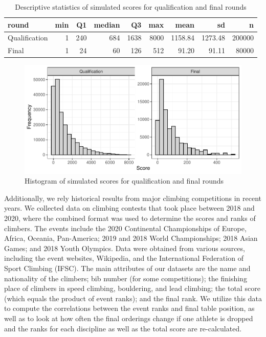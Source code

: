 \documentclass[12pt]{article}
\begin{document}
\begin{table}[H]

\caption{\label{tab:unnamed-chunk-4}Descriptive statistics of simulated scores for qualification and final rounds}
\centering
\begin{tabular}[t]{lrrrrrrrr}
\toprule
round & min & Q1 & median & Q3 & max & mean & sd & n\\
\midrule
Qualification & 1 & 240 & 684 & 1638 & 8000 & 1158.84 & 1273.48 & 200000\\
Final & 1 & 24 & 60 & 126 & 512 & 91.20 & 91.11 & 80000\\
\bottomrule
\end{tabular}
\end{table}

\begin{figure}

{\centering \includegraphics{draft_files/figure-latex/unnamed-chunk-5-1} 

}

\caption{Histogram of simulated scores for qualification and final rounds}\label{fig:unnamed-chunk-5}
\end{figure}

Additionally, we rely historical results from major climbing
competitions in recent years. We collected data on climbing contests
that took place between 2018 and 2020, where the combined format was
used to determine the scores and ranks of climbers. The events include
the 2020 Continental Championships of Europe, Africa, Oceania,
Pan-America; 2019 and 2018 World Championships; 2018 Asian Games; and
2018 Youth Olympics. Data were obtained from various sources, including
the event websites, Wikipedia, and the International Federation of Sport
Climbing (IFSC). The main attributes of our datasets are the name and
nationality of the climbers; bib number (for some competitions); the
finishing place of climbers in speed climbing, bouldering, and lead
climbing; the total score (which equals the product of event ranks); and
the final rank. We utilize this data to compute the correlations between
the event ranks and final table position, as well as to look at how
often the final orderings change if one athlete is dropped and the ranks
for each discipline as well as the total score are re-calculated.
\end{document}
